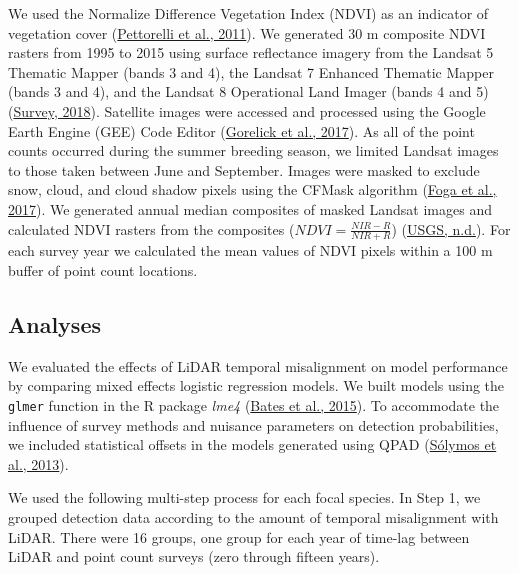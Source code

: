 \documentclass[
]{article}
\begin{document}
We used the Normalize Difference Vegetation Index (NDVI) as an indicator of vegetation cover (\protect\hyperlink{ref-pettorelliNormalizedDifferenceVegetation2011}{Pettorelli et al., 2011}). We generated 30 m composite NDVI rasters from 1995 to 2015 using surface reflectance imagery from the Landsat 5 Thematic Mapper (bands 3 and 4), the Landsat 7 Enhanced Thematic Mapper (bands 3 and 4), and the Landsat 8 Operational Land Imager (bands 4 and 5)(\protect\hyperlink{ref-geologicalsurveyLandsat47Surface2018}{Survey, 2018}). Satellite images were accessed and processed using the Google Earth Engine (GEE) Code Editor (\protect\hyperlink{ref-gorelickGoogleEarthEngine2017}{Gorelick et al., 2017}). As all of the point counts occurred during the summer breeding season, we limited Landsat images to those taken between June and September. Images were masked to exclude snow, cloud, and cloud shadow pixels using the CFMask algorithm (\protect\hyperlink{ref-fogaCloudDetectionAlgorithm2017}{Foga et al., 2017}). We generated annual median composites of masked Landsat images and calculated NDVI rasters from the composites (\(NDVI=\frac{NIR-R}{NIR+R}\)) (\protect\hyperlink{ref-USGS_NDVI}{USGS, n.d.}). For each survey year we calculated the mean values of NDVI pixels within a 100 m buffer of point count locations.

\hypertarget{analyses}{%
\subsection{Analyses}\label{analyses}}

We evaluated the effects of LiDAR temporal misalignment on model performance by comparing mixed effects logistic regression models. We built models using the \texttt{glmer} function in the R package \emph{lme4} (\protect\hyperlink{ref-batesFittingLinearMixedeffects2015}{Bates et al., 2015}). To accommodate the influence of survey methods and nuisance parameters on detection probabilities, we included statistical offsets in the models generated using QPAD (\protect\hyperlink{ref-SolymosMatsuoka2013}{Sólymos et al., 2013}).

We used the following multi-step process for each focal species. In Step 1, we grouped detection data according to the amount of temporal misalignment with LiDAR. There were 16 groups, one group for each year of time-lag between LiDAR and point count surveys (zero through fifteen years).
\end{document}
